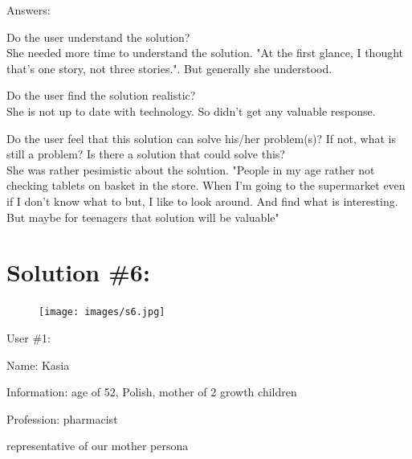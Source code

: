 \documentclass[a4paper,10pt,oneside]{scrreprt}
\begin{document}
Answers:
\begin{compactitem}
	\item Do the user understand the solution?\\
	She needed more time to understand the solution. "At the first glance, I thought that's one story, not three stories.". But generally she understood.\\

	\item Do the user find the solution realistic?\\
	She is not up to date with technology. So didn't get any valuable response.
\\

	\item Do the user feel that this solution can solve his/her problem(s)? If not, what is still
	a problem? Is there a solution that could solve this?\\
	She was rather pesimistic about the solution. "People in my age rather not checking tablets on basket in the store. When I'm going to the supermarket even if I don't know what to but, I like to look around. And find what is interesting. But maybe for teenagers that solution will be valuable"\\
\end{compactitem}

\clearpage
\section{Solution \#6:}

\begin{figure}[H]
	\centering
	\texttt{[image: images/s6.jpg]}
\end{figure}


User \#1:
\begin{compactitem}
	\item Name: Kasia
	\item Information: age of 52, Polish, mother of 2 growth children
	\item Profession: pharmacist
	\item representative of our mother persona
\end{compactitem}
\bigskip
\end{document}
